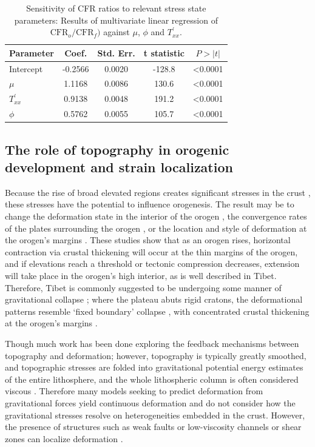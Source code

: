 \documentclass[twocolumn,jgrga]{AGUTeX}
\begin{document}
\begin{article}
{\begin{table}[htb]
\centering
\begin{tabular}{l c c c c}
\hline
Parameter & Coef. & Std. Err. & t statistic & $P>|t|$ \\
\hline
Intercept & -0.2566 & 0.0020 & -128.8 & \textless{}0.0001 \\ 
$\mu$ & 1.1168 & 0.0086 & 130.6 & \textless{}0.0001 \\ 
$T^\prime_{xx}$ & 0.9138 & 0.0048 & 191.2 & \textless{}0.0001 \\ 
$\phi$ & 0.5762 & 0.0055 & 105.7 & \textless{}0.0001 \\ 
\hline
\end{tabular}
\caption{Sensitivity of CFR ratios to relevant stress state parameters:
Results of multivariate linear regression of
$\mathrm{CFR}_o/ \mathrm{CFR}_f)$ against $\mu$, $\phi$ and
$T^\prime_{xx}$.}
\label{table:cfr_regress}
\end{table}

\subsection{The role of topography in orogenic development and strain
localization}\label{the-role-of-topography-in-orogenic-development-and-strain-localization}

Because the rise of broad elevated regions creates significant stresses
in the crust \citep[e.g.,][]{jeffreys1924}, these stresses have the
potential to influence orogenesis. The result may be to change the deformation
state in the interior of the orogen \citep[e.g.,][]{dewey1988, molnar1988}, the
convergence rates of the plates surrounding the orogen \citep[e.g.][]
{meade2008}, or the location and style of deformation at the orogen's
margins \citep[e.g.,][]{beaumont2001, decelles2009}. These studies show that
as an orogen rises, horizontal contraction via crustal thickening will
occur at the thin margins of the orogen, and if elevations reach a
threshold or tectonic compression decreases, extension will take place
in the orogen's high interior, as is well described in Tibet. Therefore,
Tibet is commonly suggested to be undergoing some manner of
gravitational collapse \citep[e.g.,][]{england1989}; where the plateau abuts
rigid cratons, the deformational patterns resemble `fixed boundary'
collapse \citep{rey2001}, with concentrated crustal thickening at the
orogen's margins \citep[e.g.,][]{cook2008}.

Though much work has been done exploring the feedback mechanisms between
topography and deformation; however, topography is typically greatly smoothed,
and topographic stresses are folded into gravitational potential energy
estimates of the entire lithosphere, and the whole lithospheric column
is often considered viscous \citep{copleymckenzie2007}. Therefore many
models seeking to predict deformation from gravitational forces yield
continuous deformation and do not consider how the gravitational
stresses resolve on heterogeneities embedded in the crust. However, the
presence of structures such as weak faults \citep{bird1994} or
low-viscosity channels or shear zones \citep[e.g.,][]{clark2005} can localize
deformation \citep[e.g.,][]{bird1994, fleschbendick2012}.

}
\end{article}
\end{document}
